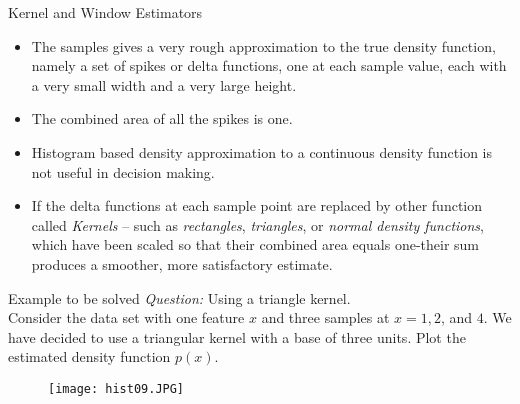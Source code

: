 \begin{frame}{Kernel and Window Estimators}
\begin{itemize}
\item The samples gives a very rough approximation to the true density function, namely a set of spikes or delta functions, one at each sample value, each with a very small width and a very large height.
\item The combined area of all the spikes is one.
\item Histogram based density approximation to  a continuous density function is not useful in decision making.
\item If the delta functions at each sample point are replaced by other function called \textit{\color{mycolor2}Kernels} -- such as \textit{\color{mycolor2}rectangles}, \textit{\color{mycolor2}triangles}, or \textit{\color{mycolor2}normal density functions}, which have been scaled so that their combined area equals one-their sum produces a smoother, more satisfactory estimate.
\end{itemize}
\end{frame}

\begin{frame}{Example to be solved}
\textit{\color{mycolor1}Question:} Using a triangle kernel.\\
Consider the data set with one feature $x$ and three samples at $x=1,2$, and $4$. We have decided to use a triangular kernel with a base of three units. Plot the estimated density function $p(x)$.\nocite{duda2012pattern}\nocite{gose1997pattern}
\begin{figure}
\texttt{[image: hist09.JPG]}
\end{figure}
\end{frame}


